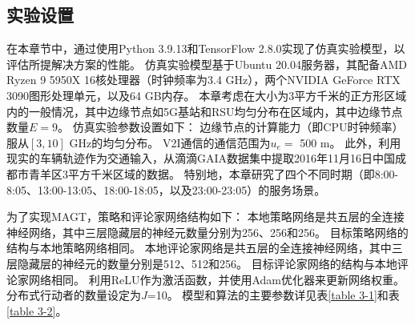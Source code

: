\subsection[\hspace{-2pt}实验设置]{{ \hspace{-8pt}实验设置}}

在本章节中，通过使用Python 3.9.13和TensorFlow 2.8.0实现了仿真实验模型，以评估所提解决方案的性能。
仿真实验模型基于Ubuntu 20.04服务器，其配备AMD Ryzen 9 5950X 16核处理器（时钟频率为3.4 GHz），两个NVIDIA GeForce RTX 3090图形处理单元，以及64 GB内存。
本章考虑在大小为3平方千米的正方形区域内的一般情况，其中边缘节点如5G基站和RSU均匀分布在区域内，其中边缘节点数量$E=9$。
仿真实验参数设置如下：
边缘节点的计算能力（即CPU时钟频率）服从$[3, 10]$ GHz的均匀分布\cite{zhou2019computation}。 
V2I通信的通信范围为$u_e =$ 500 m\cite{zhu2021decentralized}。
此外，利用现实的车辆轨迹作为交通输入，从滴滴GAIA数据集中提取2016年11月16日中国成都市青羊区3平方千米区域的数据。
特别地，本章研究了四个不同时期（即8:00-8:05、13:00-13:05、18:00-18:05，以及23:00-23:05）的服务场景。

为了实现MAGT，策略和评论家网络结构如下：
本地策略网络是共五层的全连接神经网络，其中三层隐藏层的神经元数量分别为256、256和256。
目标策略网络的结构与本地策略网络相同。
本地评论家网络是共五层的全连接神经网络，其中三层隐藏层的神经元的数量分别是512、512和256。
目标评论家网络的结构与本地评论家网络相同。
利用ReLU作为激活函数，并使用Adam优化器来更新网络权重。
分布式行动者的数量设定为$J$=10。
模型和算法的主要参数详见表\ref{table 3-1}和表\ref{table 3-2}。

\begin{table}[h]\small
{} %
\centering
{}
\label{table 3-1}
\end{table}

